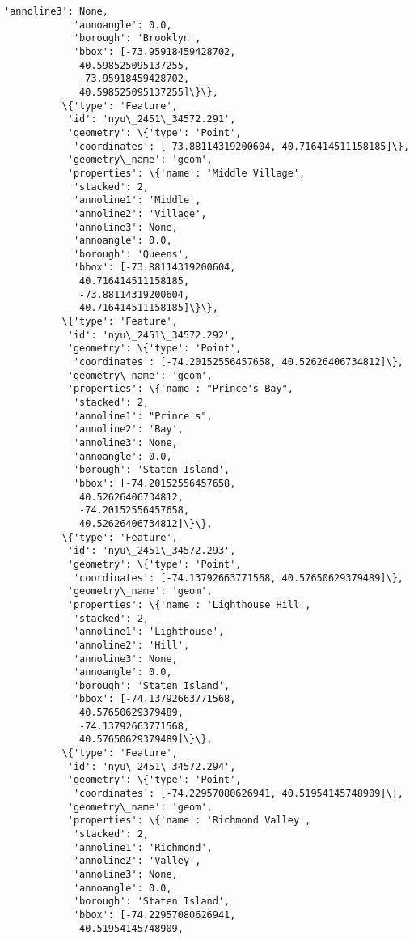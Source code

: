 \documentclass[11pt]{article}
\begin{document}
\begin{Verbatim}[commandchars=\\\{\}]
            'annoline3': None,
            'annoangle': 0.0,
            'borough': 'Brooklyn',
            'bbox': [-73.95918459428702,
             40.598525095137255,
             -73.95918459428702,
             40.598525095137255]\}\},
          \{'type': 'Feature',
           'id': 'nyu\_2451\_34572.291',
           'geometry': \{'type': 'Point',
            'coordinates': [-73.88114319200604, 40.716414511158185]\},
           'geometry\_name': 'geom',
           'properties': \{'name': 'Middle Village',
            'stacked': 2,
            'annoline1': 'Middle',
            'annoline2': 'Village',
            'annoline3': None,
            'annoangle': 0.0,
            'borough': 'Queens',
            'bbox': [-73.88114319200604,
             40.716414511158185,
             -73.88114319200604,
             40.716414511158185]\}\},
          \{'type': 'Feature',
           'id': 'nyu\_2451\_34572.292',
           'geometry': \{'type': 'Point',
            'coordinates': [-74.20152556457658, 40.52626406734812]\},
           'geometry\_name': 'geom',
           'properties': \{'name': "Prince's Bay",
            'stacked': 2,
            'annoline1': "Prince's",
            'annoline2': 'Bay',
            'annoline3': None,
            'annoangle': 0.0,
            'borough': 'Staten Island',
            'bbox': [-74.20152556457658,
             40.52626406734812,
             -74.20152556457658,
             40.52626406734812]\}\},
          \{'type': 'Feature',
           'id': 'nyu\_2451\_34572.293',
           'geometry': \{'type': 'Point',
            'coordinates': [-74.13792663771568, 40.57650629379489]\},
           'geometry\_name': 'geom',
           'properties': \{'name': 'Lighthouse Hill',
            'stacked': 2,
            'annoline1': 'Lighthouse',
            'annoline2': 'Hill',
            'annoline3': None,
            'annoangle': 0.0,
            'borough': 'Staten Island',
            'bbox': [-74.13792663771568,
             40.57650629379489,
             -74.13792663771568,
             40.57650629379489]\}\},
          \{'type': 'Feature',
           'id': 'nyu\_2451\_34572.294',
           'geometry': \{'type': 'Point',
            'coordinates': [-74.22957080626941, 40.51954145748909]\},
           'geometry\_name': 'geom',
           'properties': \{'name': 'Richmond Valley',
            'stacked': 2,
            'annoline1': 'Richmond',
            'annoline2': 'Valley',
            'annoline3': None,
            'annoangle': 0.0,
            'borough': 'Staten Island',
            'bbox': [-74.22957080626941,
             40.51954145748909,

\end{Verbatim}
\end{document}
